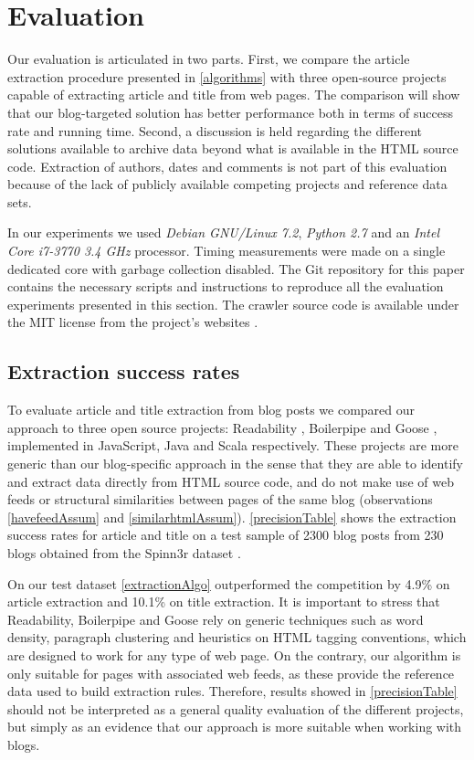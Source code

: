 \section{Evaluation}\label{evaluation}

Our evaluation is articulated in two parts. First, we compare the article extraction procedure presented in \autoref{algorithms} with three open-source projects capable of extracting article and title from web pages. The comparison will show that our blog-targeted solution has better performance both in terms of success rate and running time. Second, a discussion is held regarding the different solutions available to archive data beyond what is available in the HTML source code. Extraction of authors, dates and comments is not part of this evaluation because of the lack of publicly available competing projects and reference data sets.

In our experiments we used \emph{Debian GNU/Linux 7.2}, \emph{Python 2.7} and an \emph{Intel Core i7-3770 3.4 GHz} processor. Timing measurements were made on a single dedicated core with garbage collection disabled. The Git repository for this paper \cite{repositoryofthispaper} contains the necessary scripts and instructions to reproduce all the evaluation experiments presented in this section. The crawler source code is available under the MIT license from the project's websites \cite{blogforevercrawler}.

\subsection{Extraction success rates}
To evaluate article and title extraction from blog posts we compared our approach to three open source projects: Readability \cite{python-readability2011}, Boilerpipe \cite{kohlschuetter2010} and Goose \cite{goose2012}, implemented in JavaScript, Java and Scala respectively. These projects are more generic than our blog-specific approach in the sense that they are able to identify and extract data directly from HTML source code, and do not make use of web feeds or structural similarities between pages of the same blog (observations \ref{havefeedAssum} and \ref{similarhtmlAssum}). \autoref{precisionTable} shows the extraction success rates for article and title on a test sample of 2300 blog posts from 230 blogs obtained from the Spinn3r dataset \cite{burton2011}.

\precisionTable

On our test dataset \autoref{extractionAlgo} outperformed the competition by 4.9\% on article extraction and 10.1\% on title extraction. It is important to stress that Readability, Boilerpipe and Goose rely on generic techniques such as word density, paragraph clustering and heuristics on HTML tagging conventions, which are designed to work for any type of web page. On the contrary, our algorithm is only suitable for pages with associated web feeds, as these provide the reference data used to build extraction rules. Therefore, results showed in \autoref{precisionTable} should not be interpreted as a general quality evaluation of the different projects, but simply as an evidence that our approach is more suitable when working with blogs.


